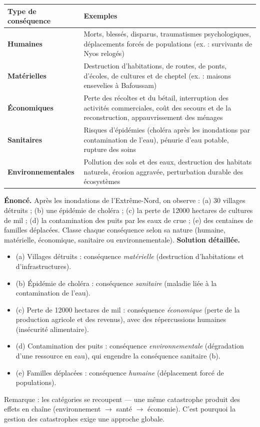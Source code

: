 \documentclass[11pt]{article}
\begin{document}
\begin{center}
\begin{tabularx}{\linewidth}{|l|X|}
\hline
\rowcolor{popblueL} \textbf{Type de conséquence} & \textbf{Exemples} \\
\hline
\textbf{Humaines} & Morts, blessés, disparus, traumatismes psychologiques, déplacements forcés de populations (ex. : survivants de Nyos relogés) \\
\hline
\textbf{Matérielles} & Destruction d'habitations, de routes, de ponts, d'écoles, de cultures et de cheptel (ex. : maisons ensevelies à Bafoussam) \\
\hline
\textbf{Économiques} & Perte des récoltes et du bétail, interruption des activités commerciales, coût des secours et de la reconstruction, appauvrissement des ménages \\
\hline
\textbf{Sanitaires} & Risques d'épidémies (choléra après les inondations par contamination de l'eau), pénurie d'eau potable, rupture des soins \\
\hline
\textbf{Environnementales} & Pollution des sols et des eaux, destruction des habitats naturels, érosion aggravée, perturbation durable des écosystèmes \\
\hline
\end{tabularx}
\end{center}

\begin{exoresolu}
\textbf{Énoncé.} Après les inondations de l'Extrême-Nord, on observe : (a) 30 villages détruits ; (b) une épidémie de choléra ; (c) la perte de \num{12000} hectares de cultures de mil ; (d) la contamination des puits par les eaux de crue ; (e) des centaines de familles déplacées. Classe chaque conséquence selon sa nature (humaine, matérielle, économique, sanitaire ou environnementale).
\tcblower
\textbf{Solution détaillée.}
\begin{itemize}
\item (a) Villages détruits : conséquence \emph{matérielle} (destruction d'habitations et d'infrastructures).
\item (b) Épidémie de choléra : conséquence \emph{sanitaire} (maladie liée à la contamination de l'eau).
\item (c) Perte de \num{12000} hectares de mil : conséquence \emph{économique} (perte de la production agricole et des revenus), avec des répercussions humaines (insécurité alimentaire).
\item (d) Contamination des puits : conséquence \emph{environnementale} (dégradation d'une ressource en eau), qui engendre la conséquence sanitaire (b).
\item (e) Familles déplacées : conséquence \emph{humaine} (déplacement forcé de populations).
\end{itemize}
Remarque : les catégories se recoupent — une même catastrophe produit des effets en chaîne (environnement $\rightarrow$ santé $\rightarrow$ économie). C'est pourquoi la gestion des catastrophes exige une approche globale.
\end{exoresolu}
\end{document}
